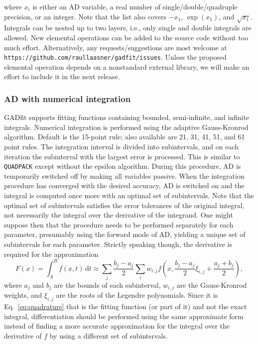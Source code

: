 \documentclass{article}
\newcommand{\D}{\,\textrm{d}}
\begin{document}
where $x_i$ is either an AD variable, a real number of single/double/quadruple precision, or an integer. Note that the list also covers $-x_1$, $\exp(x_1)$, and $\sqrt{x_1}$. Integrals can be nested up to two layers, i.e., only single and double integrals are allowed. New elemental operations can be added to the source code without too much effort. Alternatively, any requests/suggestions are most welcome at \texttt{https://github.com/raullaasner/gadfit/issues}. Unless the proposed elemental operation depends on a nonstandard external library, we will make an effort to include it in the next release.

\subsubsection{AD with numerical integration}

GADfit supports fitting functions containing bounded, semi-infinite, and infinite integrals. Numerical integration is performed using the adaptive Gauss-Kronrod algorithm. Default is the 15-point rule; also available are 21, 31, 41, 51, and 61 point rules. The integration interval is divided into subintervals, and on each iteration the subinterval with the largest error is processed. This is similar to \texttt{QUADPACK} except without the epsilon algorithm. During this procedure, AD is temporarily switched off by making all variables passive. When the integration procedure has converged with the desired accuracy, AD is switched on and the integral is computed once more with an optimal set of subintervals. Note that the optimal set of subintervals satisfies the error tolerances of the original integral, not necessarily the integral over the derivative of the integrand. One might suppose then that the procedure needs to be performed separately for each parameter, presumably using the forward mode of AD, yielding a unique set of subintervals for each parameter. Strictly speaking though, the derivative is required for the approximation
\begin{equation}
  \label{eq:quadrature}
  F(x) = \int_A^B f(x,t) \D t \approx \sum_j \frac{b_j-a_j}{2}\sum_i
  w_{i,j} f \left( x, \frac{b_j-a_j}{2}\xi_{i,j} + \frac{a_j+b_j}{2}
  \right),
\end{equation}
where $a_j$ and $b_j$ are the bounds of each subinterval, $w_{i,j}$ are the Gauss-Kronrod weights, and $\xi_{i,j}$ are the roots of the Legendre polynomials. Since it is Eq.~\eqref{eq:quadrature} that is the fitting function (or part of it) and not the exact integral, differentiation should be performed using the same approximate form instead of finding a more accurate approximation for the integral over the derivative of $f$ by using a different set of subintervals.
\end{document}
